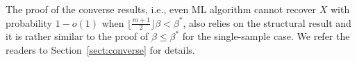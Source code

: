 \documentclass[conference]{IEEEtran}
\begin{document}
The proof of the converse results, i.e., even ML algorithm cannot recover $X$ with probability $1-o(1)$ when $\lfloor \frac{m+1}{2} \rfloor \beta < \beta^\ast$, also relies on the structural result and it is rather similar to the proof of $\beta\le\beta^\ast$ for the single-sample case. We refer the readers to Section~\ref{sect:converse} for details.




\end{document}
